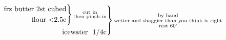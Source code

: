 \documentclass[12pt]{standalone}
\begin{document}
\[
\begin{rcases}\begin{alignedat}{3}
\begin{rcases}\begin{alignedat}{3}
\text{frz butter 2st cubed}\\
\text{flour <2.5c}\\
\end{alignedat}\end{rcases}
\substack{\text{cut in}\\\text{then pinch in}}\\
\text{icewater ~1/4c}\\
\end{alignedat}\end{rcases}
\substack{\text{by hand}\\\text{wetter and shaggier than you think is right}\\\text{rest 60'}}\\
\]
\end{document}
